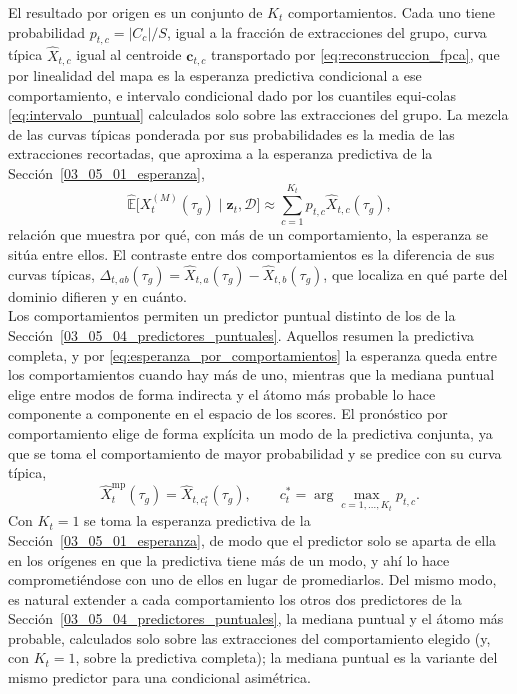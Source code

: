 El resultado por origen es un conjunto de $K_t$ comportamientos. Cada uno tiene probabilidad $p_{t,c} = \lvert C_c \rvert / S$, igual a la fracción de extracciones del grupo, curva típica $\widehat{X}_{t,c}$ igual al centroide $\mathbf{c}_{t,c}$ transportado por \eqref{eq:reconstruccion_fpca}, que por linealidad del mapa es la esperanza predictiva condicional a ese comportamiento, e intervalo condicional dado por los cuantiles equi-colas \eqref{eq:intervalo_puntual} calculados solo sobre las extracciones del grupo. La mezcla de las curvas típicas ponderada por sus probabilidades es la media de las extracciones recortadas, que aproxima a la esperanza predictiva de la Sección~\ref{03_05_01_esperanza},
\begin{equation}\label{eq:esperanza_por_comportamientos}
    \widehat{\mathbb{E}}\bigl[X_t^{(M)}(\tau_g) \mid \mathbf{z}_t, \mathcal{D}\bigr]
    \approx \sum_{c=1}^{K_t} p_{t,c}\widehat{X}_{t,c}(\tau_g),
\end{equation}
relación que muestra por qué, con más de un comportamiento, la esperanza se sitúa entre ellos. El contraste entre dos comportamientos es la diferencia de sus curvas típicas, $\Delta_{t,ab}(\tau_g) = \widehat{X}_{t,a}(\tau_g) - \widehat{X}_{t,b}(\tau_g)$, que localiza en qué parte del dominio difieren y en cuánto.\\

Los comportamientos permiten un predictor puntual distinto de los de la Sección~\ref{03_05_04_predictores_puntuales}. Aquellos resumen la predictiva completa, y por \eqref{eq:esperanza_por_comportamientos} la esperanza queda entre los comportamientos cuando hay más de uno, mientras que la mediana puntual elige entre modos de forma indirecta y el átomo más probable lo hace componente a componente en el espacio de los scores. El pronóstico por comportamiento elige de forma explícita un modo de la predictiva conjunta, ya que se toma el comportamiento de mayor probabilidad y se predice con su curva típica,
\begin{equation}\label{eq:pronostico_comportamiento}
    \widehat{X}_t^{\mathrm{mp}}(\tau_g) = \widehat{X}_{t,c_t^{*}}(\tau_g),
    \qquad
    c_t^{*} = \arg\max_{c = 1, \ldots, K_t} p_{t,c}.
\end{equation}
Con $K_t = 1$ se toma la esperanza predictiva de la Sección~\ref{03_05_01_esperanza}, de modo que el predictor solo se aparta de ella en los orígenes en que la predictiva tiene más de un modo, y ahí lo hace comprometiéndose con uno de ellos en lugar de promediarlos. Del mismo modo, es natural extender a cada comportamiento los otros dos predictores de la Sección~\ref{03_05_04_predictores_puntuales}, la mediana puntual y el átomo más probable, calculados solo sobre las extracciones del comportamiento elegido (y, con $K_t = 1$, sobre la predictiva completa); la mediana puntual es la variante del mismo predictor para una condicional asimétrica.

